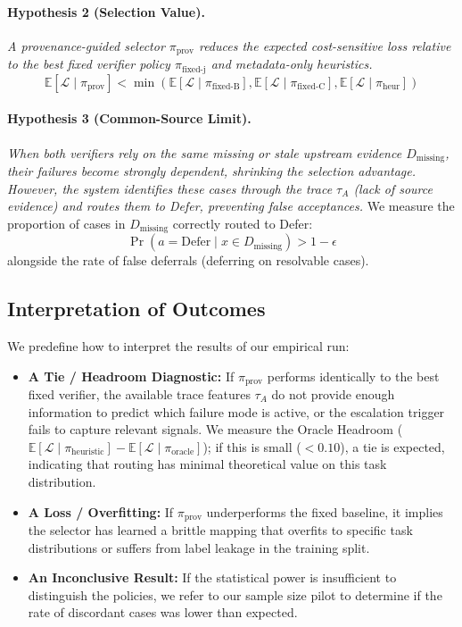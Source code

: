 \documentclass[manuscript,screen,nonacm]{acmart}
\begin{document}
\paragraph{Hypothesis 2 (Selection Value).}
\emph{A provenance-guided selector $\pi_{\text{prov}}$ reduces the expected cost-sensitive loss relative to the best fixed verifier policy $\pi_{\text{fixed-j}}$ and metadata-only heuristics.}
\begin{equation}
    \mathbb{E}[\mathcal{L} \mid \pi_{\text{prov}}] < \min \left( \mathbb{E}[\mathcal{L} \mid \pi_{\text{fixed-B}}], \mathbb{E}[\mathcal{L} \mid \pi_{\text{fixed-C}}], \mathbb{E}[\mathcal{L} \mid \pi_{\text{heur}}] \right)
\end{equation}

\paragraph{Hypothesis 3 (Common-Source Limit).}
\emph{When both verifiers rely on the same missing or stale upstream evidence $D_{\text{missing}}$, their failures become strongly dependent, shrinking the selection advantage. However, the system identifies these cases through the trace $\tau_A$ (lack of source evidence) and routes them to Defer, preventing false acceptances.}
We measure the proportion of cases in $D_{\text{missing}}$ correctly routed to Defer:
\begin{equation}
    \Pr(a = \text{Defer} \mid x \in D_{\text{missing}}) > 1 - \epsilon
\end{equation}
alongside the rate of false deferrals (deferring on resolvable cases).

\subsection{Interpretation of Outcomes}
We predefine how to interpret the results of our empirical run:
\begin{itemize}
    \item \textbf{A Tie / Headroom Diagnostic:} If $\pi_{\text{prov}}$ performs identically to the best fixed verifier, the available trace features $\tau_A$ do not provide enough information to predict which failure mode is active, or the escalation trigger fails to capture relevant signals. We measure the Oracle Headroom ($\mathbb{E}[\mathcal{L} \mid \pi_{\text{heuristic}}] - \mathbb{E}[\mathcal{L} \mid \pi_{\text{oracle}}]$); if this is small ($<0.10$), a tie is expected, indicating that routing has minimal theoretical value on this task distribution.
    \item \textbf{A Loss / Overfitting:} If $\pi_{\text{prov}}$ underperforms the fixed baseline, it implies the selector has learned a brittle mapping that overfits to specific task distributions or suffers from label leakage in the training split.
    \item \textbf{An Inconclusive Result:} If the statistical power is insufficient to distinguish the policies, we refer to our sample size pilot to determine if the rate of discordant cases was lower than expected.
\end{itemize}
\end{document}
